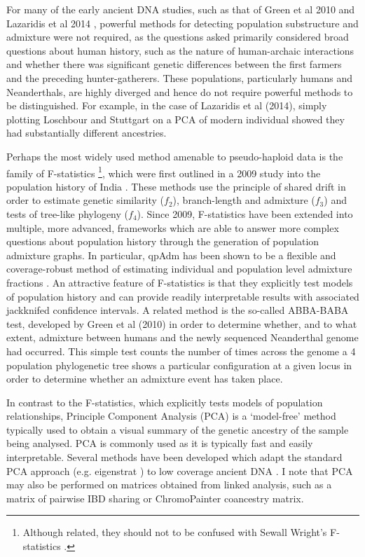 For many of the early ancient DNA studies, such as that of Green et al 2010 \cite{Green2010} and Lazaridis et al 2014 \cite{Lazaridis2014}, powerful methods for detecting population substructure and admixture were not required, as the questions asked primarily considered broad questions about human history, such as the nature of human-archaic interactions and whether there was significant genetic differences between the first farmers and the preceding hunter-gatherers. These populations, particularly humans and Neanderthals, are highly diverged and hence do not require powerful methods to be distinguished. For example, in the case of Lazaridis et al (2014), simply plotting Loschbour and Stuttgart on a PCA of modern individual showed they had substantially different ancestries.

Perhaps the most widely used method amenable to pseudo-haploid data is the family of F-statistics \footnote{Although related, they should not to be confused with Sewall Wright's F-statistics \cite{wright1949genetical}.}, which were first outlined in a 2009 study into the population history of India \cite{reich2009reconstructing}. These methods use the principle of shared drift in order to estimate genetic similarity ($f_{2}$), branch-length and admixture ($f_{3}$) and tests of tree-like phylogeny ($f_{4}$). Since 2009, F-statistics have been extended into multiple, more advanced, frameworks which are able to answer more complex questions about population history through the generation of population admixture graphs. In particular, qpAdm has been shown to be a flexible and coverage-robust method of estimating individual and population level admixture fractions \cite{AssessingqpAdm}. An attractive feature of F-statistics is that they explicitly test models of population history and can provide readily interpretable results with associated jackknifed confidence intervals. A related method is the so-called ABBA-BABA test, developed by Green et al (2010) \cite{Green2010} in order to determine whether, and to what extent, admixture between humans and the newly sequenced Neanderthal genome had occurred. This simple test counts the number of times across the genome a 4 population phylogenetic tree shows a particular configuration at a given locus in order to determine whether an admixture event has taken place. 

In contrast to the F-statistics, which explicitly tests models of population relationships, Principle Component Analysis (PCA) is a `model-free' method typically used to obtain a visual summary of the genetic ancestry of the sample being analysed. PCA is commonly used as it is typically fast and easily interpretable. Several methods have been developed which adapt the standard PCA approach (e.g. eigenstrat \cite{price2006principal}) to low coverage ancient DNA \cite{franccois2020factor, herrando2021smartsnp, AlbrechtsenPCAmissingness}. I note that PCA may also be performed on matrices obtained from linked analysis, such as a matrix of pairwise IBD sharing or ChromoPainter coancestry matrix. 

